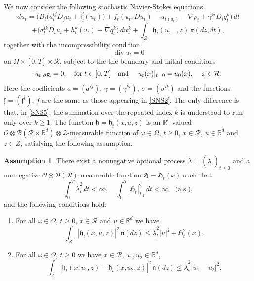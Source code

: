 \documentclass[11pt,reqno]{amsart}
\theoremstyle{definition}
\newtheorem{assumption}{Assumption}[section]
\theoremstyle{remark}
\newcommand\bR{\mathbb{R}}
\newcommand\frf{\mathfrak{f}}
\newcommand\frh{\mathfrak{h}}
\newcommand\frH{\mathfrak{H}}
\newcommand\frn{\mathfrak{n}}
\newcommand\cB{\mathcal{B}}
\newcommand\cO{\mathcal{O}}
\newcommand\cR{\mathcal{R}}
\newcommand\cZ{\mathcal{Z}}
\newcommand{\<}{\langle}
\renewcommand{\>}{\rangle}
\begin{document}
We now consider the following stochastic Navier-Stokes equations 
$$
du_t=\Big(D_i\big(a_t^{ij}D_j u_t + \frf_t^i(u_t))
+ f_t(u_t,Du_t)- u_{t(u_t)}-\nabla p_t
+ \gamma_t^{ki}D_i q_t^k\Big)\,dt
$$
\begin{equation}
                                                                \label{SNS5}
+\Big(\sigma_t^{ik}D_i u_t+ h_t^k(u_t)-\nabla q_t^k\Big)\,dw_t^k
+\int_{Z}\frh_t(u_{t-},z)\,\tilde\pi(dz,dt), 
\end{equation}
together with the incompressibility condition 
 \begin{equation}
                                                   \label{div5}
\operatorname{div}u_t=0
\end{equation}
on $\Omega\times[0,T]\times\cR$, subject to the 
the boundary and initial conditions 
\begin{equation}
                                                         \label{bin5}
u_t|_{\partial \cR}=0, \quad \text{for $t\in[0,T]$\quad 
and
\quad 
$u_t(x)|_{t=0}=u_0(x)$,
\quad$ x\in \cR$}.   
\end{equation}
Here  the coefficients $a=(a^{ij})$, $\gamma=(\gamma^{ki})$, 
$\sigma=(\sigma^{ik})$ and the functions $\frf=(\frf^i)$, $f$ are the same 
as those appearing in \eqref{SNS2}. 
The only difference is that, in \eqref{SNS5}, 
the summation over the repeated index $k$ is understood to run only over $k\geq1$.
The function $\frh=\frh_t(x,u,z)$ is an $\bR^d$-valued 
$\cO\otimes\cB(\cR\times\bR^d)\otimes\cZ$-measurable function 
of $\omega\in\Omega$, $t\geq0$, $x\in\cR$, $u\in\bR^d$ and $z\in Z$, 
satisfying the following assumption.   

\begin{assumption} 
                                                   \label{assumption2c}
There exist a nonnegative optional process $\tilde \lambda=(\tilde\lambda_t)_{t\geq0}$
and a nonnegative $\cO\otimes\cB(\cR)$-measurable function
$\frH=\frH_t(x)$ such that
$$
\int_0^T\tilde\lambda_t^2\,dt<\infty,
\quad
\int_0^T|\frH_t|_{L_2}^2\,dt<\infty
\quad \text{(a.s.)},
$$
and the following conditions hold: 
\begin{enumerate}
\item[(i)]
For all
$\omega\in\Omega$, $t\geq0$, $x\in\cR$ and $u\in\mathbb R^d$ we have  
$$
\int_{Z}|\frh_t(x,u,z)|^2\,\frn(dz)\leq \tilde\lambda^2_t|u|^2+\frH^2_t(x). 
$$
\item[(ii)]
For all $\omega\in\Omega$, $t\geq0$ we have  
$x\in\cR$, $u_1, u_2\in\bR^d$,  
$$
\int_{Z}|\frh_t(x,u_1,z)-\frh_t(x,u_2,z)|^2\,\frn(dz)
\leq \tilde\lambda^2_t |u_1-u_2|^2.
$$
\end{enumerate}
\end{assumption}
\end{document}

